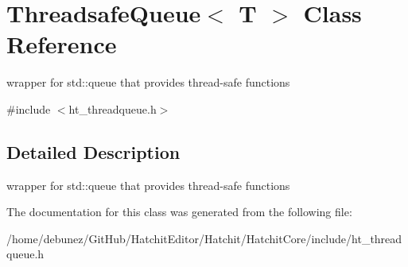 \hypertarget{classThreadsafeQueue_3_01T_01_4}{}\section{Threadsafe\+Queue$<$ T $>$ Class Reference}
\label{classThreadsafeQueue_3_01T_01_4}


wrapper for std\+::queue that provides thread-\/safe functions  




{\ttfamily \#include $<$ht\+\_\+threadqueue.\+h$>$}



\subsection{Detailed Description}
wrapper for std\+::queue that provides thread-\/safe functions 

The documentation for this class was generated from the following file\+:\begin{DoxyCompactItemize}
\item 
/home/debunez/\+Git\+Hub/\+Hatchit\+Editor/\+Hatchit/\+Hatchit\+Core/include/ht\+\_\+threadqueue.\+h\end{DoxyCompactItemize}
